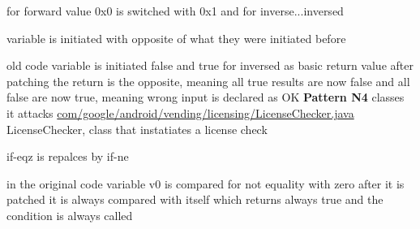 

for forward value 0x0 is switched with 0x1 and for inverse...inversed



variable is initiated with opposite of what they were initiated before




old code variable is initiated false and true for inversed as basic return value
after patching the return is the opposite, meaning all true results are now false and all false are now true, meaning wrong input is declared as OK
\newline
\newline
\textbf{Pattern N4}\newline
classes it attacks
\url{com/google/android/vending/licensing/LicenseChecker.java}
LicenseChecker, class that instatiates a license check\cite{developersLicensingReference}



if-eqz is repalces by if-ne


in the original code variable v0 is compared for not equality with zero
after it is patched it is always compared with itself which returns always true and the condition is always called



